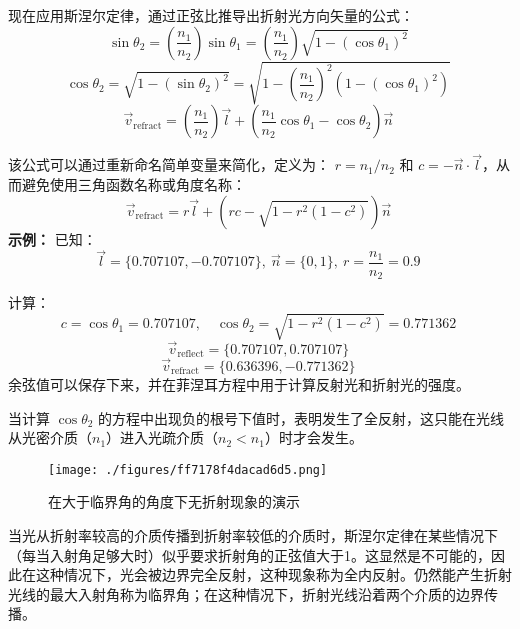 现在应用斯涅尔定律，通过正弦比推导出折射光方向矢量的公式：  
\[
\sin \theta_2 = \left( \frac{n_1}{n_2} \right) \sin \theta_1 = \left( \frac{n_1}{n_2} \right) \sqrt{1 - \left( \cos \theta_1 \right)^2}~
\]
\[
\cos \theta_2 = \sqrt{1 - (\sin \theta_2)^2} = \sqrt{1 - \left( \frac{n_1}{n_2} \right)^2 \left( 1 - \left( \cos \theta_1 \right)^2 \right)}~
\]
\[
\vec{v}_{\text{refract}} = \left( \frac{n_1}{n_2} \right) \vec{l} + \left( \frac{n_1}{n_2} \cos \theta_1 - \cos \theta_2 \right) \vec{n}~
\]

该公式可以通过重新命名简单变量来简化，定义为：  
\( r = n_1 / n_2 \) 和 \( c = -\vec{n} \cdot \vec{l} \)，从而避免使用三角函数名称或角度名称：  
\[
\vec{v}_{\text{refract}} = r\vec{l} + \left( rc - \sqrt{1 - r^2 (1 - c^2)} \right)\vec{n}~
\]
\textbf{示例：} 
已知：  
\[
\vec{l} = \{0.707107, -0.707107\},~\vec{n} = \{0, 1\},~r = \frac{n_1}{n_2} = 0.9~
\]

计算：  
\[
c = \cos \theta_1 = 0.707107, \quad \cos \theta_2 = \sqrt{1 - r^2 (1 - c^2)} = 0.771362~
\]
\[
\vec{v}_{\text{reflect}} = \{0.707107, 0.707107\}~
\]
\[
\vec{v}_{\text{refract}} = \{0.636396, -0.771362\}~
\]
余弦值可以保存下来，并在菲涅耳方程中用于计算反射光和折射光的强度。

当计算 \(\cos \theta_2\) 的方程中出现负的根号下值时，表明发生了全反射，这只能在光线从光密介质（\(n_1\)）进入光疏介质（\(n_2 < n_1\)）时才会发生。


\begin{figure}[ht]
\centering
\texttt{[image: ./figures/ff7178f4dacad6d5.png]}
\caption{在大于临界角的角度下无折射现象的演示} \label{fig_SNR_8}
\end{figure}
当光从折射率较高的介质传播到折射率较低的介质时，斯涅尔定律在某些情况下（每当入射角足够大时）似乎要求折射角的正弦值大于1。这显然是不可能的，因此在这种情况下，光会被边界完全反射，这种现象称为全内反射。仍然能产生折射光线的最大入射角称为临界角；在这种情况下，折射光线沿着两个介质的边界传播。